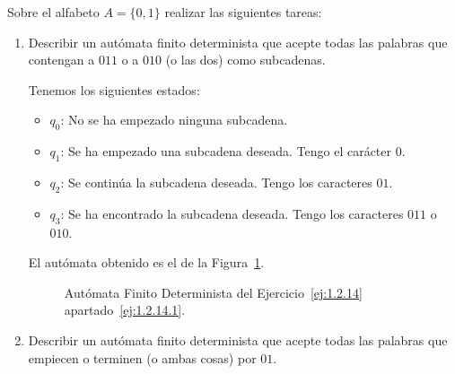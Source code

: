 \begin{ejercicio} \label{ej:1.2.14}
    Sobre el alfabeto $A = \{0, 1\}$ realizar las siguientes tareas:
    \begin{enumerate}
        \item \label{ej:1.2.14.1}
        Describir un autómata finito determinista que acepte todas las palabras que contengan a $011$ o a $010$ (o las dos) como subcadenas.
        
        Tenemos los siguientes estados:
        \begin{itemize}
            \item \ul{$q_0$}: No se ha empezado ninguna subcadena.
            \item \ul{$q_1$}: Se ha empezado una subcadena deseada. Tengo el carácter $0$.
            \item \ul{$q_2$}: Se continúa la subcadena deseada. Tengo los caracteres $01$.
            \item \ul{$q_3$}: Se ha encontrado la subcadena deseada. Tengo los caracteres $011$ o $010$.
        \end{itemize}

        El autómata obtenido es el de la Figura~\ref{fig:ej:1.2.14.1}.
        \begin{figure}
            \centering
            \caption{Autómata Finito Determinista del Ejercicio~\ref{ej:1.2.14} apartado~\ref{ej:1.2.14.1}.}
            \label{fig:ej:1.2.14.1}
        \end{figure}
        
        \item \label{ej:1.2.14.2}
        Describir un autómata finito determinista que acepte todas las palabras que empiecen o terminen (o ambas cosas) por $01$.
        

\end{enumerate}
\end{ejercicio}
